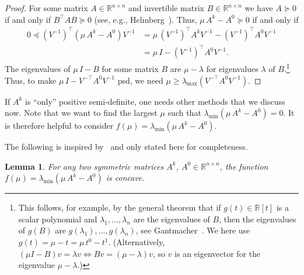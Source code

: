 \documentclass[10pt, a4paper]{article}
\newcommand{\T}{^{\top}}
\newcommand{\R}{\mathds{R}}
\newtheorem{lemma}[theorem]{Lemma}
\begin{document}
\begin{proof}
  For some matrix $A \in \R^{n \times n}$ and invertible matrix
  $B \in \R^{n \times n}$ we have $A \succeq 0$ if and only if
  $B\T A B \succeq 0$ (see, e.g., Helmberg~\cite[Prop.~1.1.7]{Hel00}).
  Thus, $\mu\, A^k - A^0 \succeq 0$ if and only if
  \begin{align*}
    0 \preceq (V^{-1})^\top (\mu\, A^k - A^0) V^{-1} &= \mu\,
    (V^{-1})^\top A^k V^{-1} - (V^{-1})^\top A^0 V^{-1} \\
    &= \mu\, I - (V^{-1})^\top A^0 V^{-1}.
  \end{align*}
  The eigenvalues of $\mu\, I - B$ for some matrix $B$ are $\mu - \lambda$
  for eigenvalues $\lambda$ of $B$.\footnote{This follows, for example, by the
    general theorem that if $g(t) \in \R[t]$ is a scalar polynomial and
    $\lambda_1, \dots, \lambda_n$ are the eigenvalues of $B$, then the
    eigenvalues of $g(B)$ are $g(\lambda_1), \dots, g(\lambda_n)$, see
    Gantmacher~\cite[Ch.~IV, Thm.~3]{Gan59I}. We here use
    $g(t) = \mu - t = \mu\, t^0 - t^1$. (Alternatively, $(\mu I - B)v =
    \lambda v \Leftrightarrow Bv = (\mu - \lambda)v$, so $v$ is an
    eigenvector for the eigenvalue $\mu - \lambda$.)}  Thus, to make
  $\mu\, I - V^{-\top} A^0 V^{-1}$ psd, we need
  $\mu \geq \lambda_{\max}(V^{-\top} A^0 V^{-1})$.
\end{proof}

If $A^k$ is ``only'' positive semi-definite, one needs other methods that
we discuss now. Note that we want to find the largest $\mu$ such that
$\lambda_{\min}(\mu\, A^k - A^0) = 0$. It is therefore helpful to consider
$f(\mu) = \lambda_{\min}(\mu\, A^k - A^0)$.

The following is inspired by~\cite{Str16,HigSS16} and only stated here for completeness.

\begin{lemma}
  For any two symmetric matrices $A^k$, $A^0 \in \R^{n \times n}$, the function
  $f(\mu) = \lambda_{\min}(\mu\, A^k - A^0)$ is concave.
\end{lemma}
\end{document}
